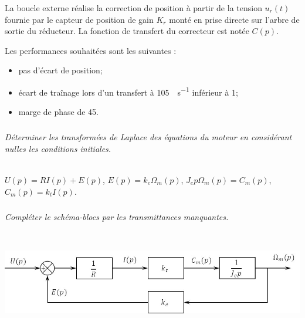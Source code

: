 \documentclass[10pt,fleqn]{article} %
\begin{document}
\begin{multicols}{2}
La boucle externe  réalise  la  correction de position à partir de  la  tension $u_r(t)$  fournie par  le 
capteur de position de gain $K_r$ monté  en prise directe  sur  l’arbre de  sortie du  réducteur. La 
fonction de transfert du correcteur est notée $C(p)$. 

Les performances souhaitées sont les suivantes : 
\begin{itemize}
\item pas d’écart de position;
\item écart de traînage lors d’un transfert à \SI{105}{\degres.s^{-1}} inférieur à 1\degres ; 
\item marge de phase de 45\degres. 
\end{itemize}





\subparagraph{}\textit{Déterminer les transformées de Laplace des équations du moteur
 en considérant nulles les conditions initiales. }
\ifprof
\begin{corrige}~\\
$U(p) = RI(p) + E(p)$, $E(p) =k_e \Omega_m(p)$, $J_e p \Omega_m(p)=C_m(p)$, $C_m(p)=k_t I(p)$.
\end{corrige}
\else
\fi


\subparagraph{}\textit{Compléter le schéma-blocs par les transmittances manquantes. }
\ifprof
\begin{corrige}~\\
\begin{center}
\includegraphics[width=\linewidth]{images/cor_01}
\end{center}


\end{corrige}
\end{multicols}
\end{document}
